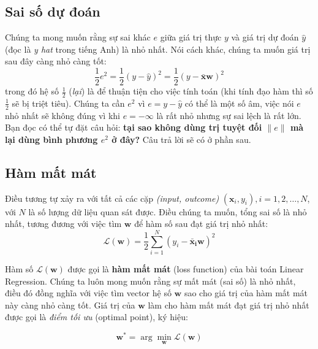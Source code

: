  
 
\subsection{Sai số dự đoán }
 
Chúng ta mong muốn rằng sự sai khác $e$ giữa giá trị thực $y$ và giá trị dự đoán $\hat{y}$ (đọc là \textit{y hat} trong tiếng Anh) là nhỏ nhất. Nói cách khác, chúng ta muốn giá trị sau đây càng nhỏ càng tốt:  
 \begin{equation*}
\frac{1}{2}e^2 = \frac{1}{2}(y - \hat{y})^2 = \frac{1}{2}(y - \mathbf{\bar{x}}\mathbf{w})^2 
\end{equation*}
 trong đó hệ số $\frac{1}{2} $ (\textit{lại}) là để thuận tiện cho việc tính toán (khi tính đạo hàm thì số $\frac{1}{2} $ sẽ bị triệt tiêu). Chúng ta cần $e^2$ vì $e = y - \hat{y} $ có thể là một số âm, việc nói $e$ nhỏ nhất sẽ không đúng vì khi $e = - \infty$ là rất nhỏ nhưng sự sai lệch là rất lớn. Bạn đọc có thể tự đặt câu hỏi: \textbf{tại sao không dùng trị tuyệt đối $ \|e\| $ mà lại dùng bình phương $e^2$ ở đây?} Câu trả lời sẽ có ở phần sau.  
 
 
 
 
 
 
\subsection{Hàm mất mát}
 
Điều tương tự xảy ra với tất cả các cặp \textit{(input, outcome)} $ (\mathbf{x}_i, y_i), i = 1, 2, \dots, N $, với $N$ là số lượng dữ liệu quan sát được. Điều chúng ta muốn, tổng sai số là nhỏ nhất, tương đương với việc tìm $ \mathbf{w} $ để hàm số sau đạt giá trị nhỏ nhất: 
\begin{equation}
\label{eqn:linearregression_loss} 
 \mathcal{L}(\mathbf{w}) = \frac{1}{2}\sum_{i=1}^N (y_i - \mathbf{\bar{x}_i}\mathbf{w})^2
\end{equation}  
 
Hàm số $\mathcal{L}(\mathbf{w}) $ được gọi là \textbf{hàm mất mát} (loss function) của bài toán Linear Regression. Chúng ta luôn mong muốn rằng sự mất mát (sai số) là nhỏ nhất, điều đó đồng nghĩa với việc  tìm vector hệ số $ \mathbf{w} $  sao cho  
giá trị của hàm mất mát này càng nhỏ càng tốt. Giá trị của $\mathbf{w}$ làm cho hàm mất mát đạt giá trị nhỏ nhất được gọi là \textit{điểm tối ưu} (optimal point), ký hiệu: 
 
$$ \mathbf{w}^* = \arg\min_{\mathbf{w}} \mathcal{L}(\mathbf{w})  $$  
 
